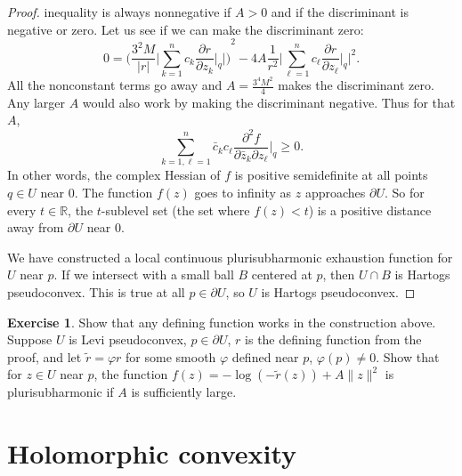 \documentclass[12pt,openany]{book}
\newcommand{\sabs}[1]{\lvert {#1} \rvert}
\newcommand{\snorm}[1]{\lVert {#1} \rVert}
\newcommand{\BBabs}[1]{\Biggl\lvert {#1} \Biggr\rvert}
\newcommand{\R}{{\mathbb{R}}}
\theoremstyle{plain}
\theoremstyle{remark}
\theoremstyle{definition}
\newenvironment{exbox}{%
    \def\FrameCommand{\vrule width 1pt \relax\hspace{10pt}}%
    \MakeFramed{\advance\hsize-\width\FrameRestore}%
}{%
    \endMakeFramed
}
\theoremstyle{exercise}
\newtheorem{exercise}{Exercise}[section]
\theoremstyle{example}
\begin{document}
\begin{proof}
inequality
is always nonnegative if $A > 0$ and if the discriminant is negative or zero.
Let us see if we can make the discriminant zero:
\begin{equation*}
0 =
{\Biggl(
\frac{3^2 M}{\sabs{r}}
\BBabs{\sum_{k=1}^n c_k \frac{\partial r}{\partial z_k} \Big|_q}
\Biggr)}^2
- 4A
\frac{1}{r^2}
\BBabs{
\sum_{\ell=1}^n
c_\ell
\frac{\partial r}{\partial z_\ell} \Big|_q
}^2 .
\end{equation*}
All the nonconstant terms go away and
$A=\frac{3^4 M^2}{4}$ makes the discriminant zero.
Any larger $A$ would also work
by making the discriminant negative.
Thus for that $A$,
\begin{equation*}
\sum_{k=1,\ell=1}^n
\bar{c}_k c_\ell \frac{\partial^2 f}{\partial \bar{z}_k \partial z_\ell} \Big|_q
\geq 0.
\end{equation*}
In other words, the complex Hessian
of $f$ is positive semidefinite at all points $q \in U$ near $0$.
The function $f(z)$ goes to infinity as $z$ approaches $\partial U$.
So for every $t \in \R$, the $t$-sublevel set
(the set where $f(z) < t$) is a positive
distance away from $\partial U$ near $0$.

We have constructed a local continuous plurisubharmonic
exhaustion function for $U$ near $p$.  If we intersect
with a small ball $B$ centered at $p$, then $U \cap B$ is
Hartogs pseudoconvex.  This is true at all
$p \in \partial U$, so $U$ is Hartogs pseudoconvex.
\end{proof}

\begin{exbox}
\begin{exercise}
Show that any defining function works in the construction above.
Suppose
$U$ is Levi pseudoconvex, $p \in \partial U$,
$r$ is the defining function from the proof, and let
$\tilde{r} = \varphi r$ for some smooth $\varphi$
defined near $p$, $\varphi(p) \neq 0$.
Show that for $z \in U$ near $p$, the function
$f(z) = -\log(-\tilde{r}(z)) + A \snorm{z}^2$
is plurisubharmonic if $A$ is sufficiently large.
\end{exercise}
\end{exbox}


\section{Holomorphic convexity}
\end{document}
